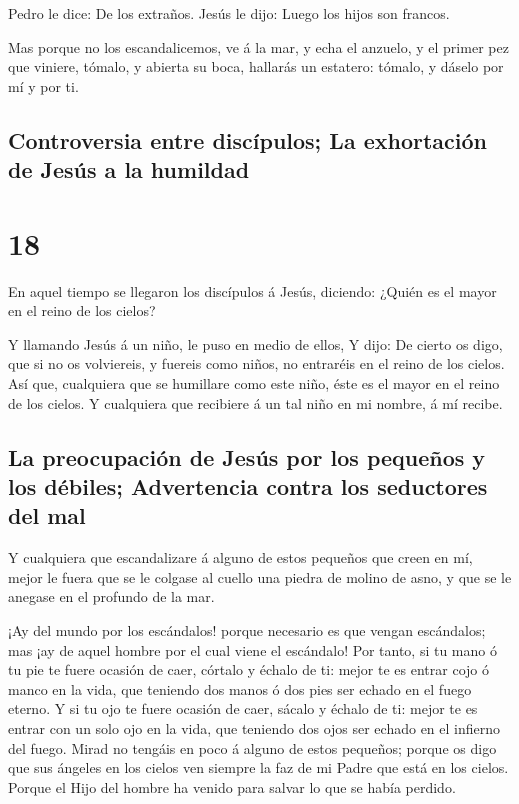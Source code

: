  Pedro le dice: De los extraños. Jesús le dijo: Luego los
hijos son francos.

 Mas porque no los escandalicemos, ve á la mar, y echa el
anzuelo, y el primer pez que viniere, tómalo, y abierta su boca,
hallarás un estatero: tómalo, y dáselo por mí y por ti.

\hypertarget{controversia-entre-discuxedpulos-la-exhortaciuxf3n-de-jesuxfas-a-la-humildad}{%
\subsection{Controversia entre discípulos; La exhortación de Jesús a la
humildad}\label{controversia-entre-discuxedpulos-la-exhortaciuxf3n-de-jesuxfas-a-la-humildad}}

\hypertarget{section-40-18}{%
\section{18}\label{section-40-18}}

 En aquel tiempo se llegaron los discípulos á Jesús,
diciendo: ¿Quién es el mayor en el reino de los cielos?

 Y llamando Jesús á un niño, le puso en medio de ellos,
 Y dijo: De cierto os digo, que si no os volviereis, y
fuereis como niños, no entraréis en el reino de los cielos.
 Así que, cualquiera que se humillare como este niño, éste
es el mayor en el reino de los cielos.  Y cualquiera que
recibiere á un tal niño en mi nombre, á mí recibe.

\hypertarget{la-preocupaciuxf3n-de-jesuxfas-por-los-pequeuxf1os-y-los-duxe9biles-advertencia-contra-los-seductores-del-mal}{%
\subsection{La preocupación de Jesús por los pequeños y los débiles;
Advertencia contra los seductores del
mal}\label{la-preocupaciuxf3n-de-jesuxfas-por-los-pequeuxf1os-y-los-duxe9biles-advertencia-contra-los-seductores-del-mal}}

 Y cualquiera que escandalizare á alguno de estos pequeños
que creen en mí, mejor le fuera que se le colgase al cuello una piedra
de molino de asno, y que se le anegase en el profundo de la mar.

 ¡Ay del mundo por los escándalos! porque necesario es que
vengan escándalos; mas ¡ay de aquel hombre por el cual viene el
escándalo!  Por tanto, si tu mano ó tu pie te fuere
ocasión de caer, córtalo y échalo de ti: mejor te es entrar cojo ó manco
en la vida, que teniendo dos manos ó dos pies ser echado en el fuego
eterno.  Y si tu ojo te fuere ocasión de caer, sácalo y
échalo de ti: mejor te es entrar con un solo ojo en la vida, que
teniendo dos ojos ser echado en el infierno del fuego. 
Mirad no tengáis en poco á alguno de estos pequeños; porque os digo que
sus ángeles en los cielos ven siempre la faz de mi Padre que está en los
cielos.  Porque el Hijo del hombre ha venido para salvar
lo que se había perdido.

